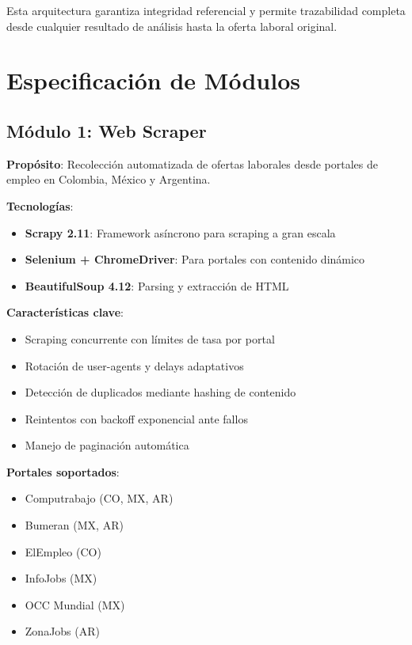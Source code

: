 Esta arquitectura garantiza integridad referencial y permite trazabilidad completa desde cualquier resultado de análisis hasta la oferta laboral original.

\section{Especificación de Módulos}

\subsection{Módulo 1: Web Scraper}

\textbf{Propósito}: Recolección automatizada de ofertas laborales desde portales de empleo en Colombia, México y Argentina.

\textbf{Tecnologías}:
\begin{itemize}
    \item \textbf{Scrapy 2.11}: Framework asíncrono para scraping a gran escala
    \item \textbf{Selenium + ChromeDriver}: Para portales con contenido dinámico
    \item \textbf{BeautifulSoup 4.12}: Parsing y extracción de HTML
\end{itemize}

\textbf{Características clave}:
\begin{itemize}
    \item Scraping concurrente con límites de tasa por portal
    \item Rotación de user-agents y delays adaptativos
    \item Detección de duplicados mediante hashing de contenido
    \item Reintentos con backoff exponencial ante fallos
    \item Manejo de paginación automática
\end{itemize}

\textbf{Portales soportados}:
\begin{itemize}
    \item Computrabajo (CO, MX, AR)
    \item Bumeran (MX, AR)
    \item ElEmpleo (CO)
    \item InfoJobs (MX)
    \item OCC Mundial (MX)
    \item ZonaJobs (AR)
\end{itemize}

